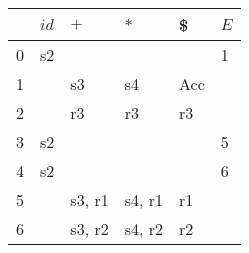 \documentclass{standalone}
\providecommand\lightrule{%
	\arrayrulecolor{black!30}%
	\midrule[\lightrulewidth]%
	\arrayrulecolor{black}}
\begin{document}
\begin{tabularx}{\textwidth}{XXXXXX}
    & \(id\) & \(+\) & \(\ast\) & \$ & \(E\) \\
    \midrule
        0
        &
        s2
        & & & &
        1
        \\ \lightrule

        1
        & &
        s3
        &
        s4
        &
        Acc
        &
        \\ \lightrule

        2
        & &
        r3
        &
        r3
        &
        r3
        &
        \\ \lightrule

        3
        &
        s2
        & & & &
        5
        \\ \lightrule

        4
        &
        s2
        & & & &
        6
        \\ \lightrule

        5
        & &
        s3, r1
        &
        s4, r1
        &
        r1
        &
        \\ \lightrule

        6
        & &
        s3, r2
        &
        s4, r2
        &
        r2
        &
        \\
\end{tabularx}
\end{document}
